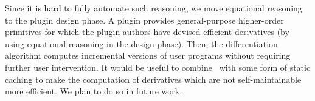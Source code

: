 Since it is hard to fully automate such reasoning, we move
equational reasoning to the plugin design phase. A 
plugin provides general-purpose higher-order primitives for which
the plugin authors have devised efficient derivatives (by using
equational reasoning in the design phase). Then, the
differentiation algorithm computes incremental
versions of user programs without requiring further user intervention.
It would be useful to combine \ILC\ with some form of static
caching to make the computation of derivatives which
are not self-maintainable more efficient. We plan to do so
in future work.
%
